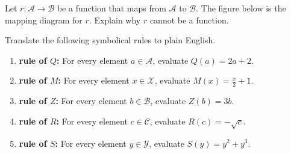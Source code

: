 \documentclass[12pt]{article} %
\begin{document}
\begin{qstn}
  Let $r \colon \mathcal{A} \to \mathcal{B}$ be a function that maps from $\mathcal{A}$ to $\mathcal{B}$. The figure below is the
  mapping diagram for $r$. Explain why $r$ cannot be a function. 

\begin{center}
\end{center}

\end{qstn}


\begin{qstn}
	Translate the following symbolical rules to plain English.
		\begin{enumerate}[label=(\alph*)]
			\item \textbf{rule of $Q$:} For every element $a\in \mathcal{A}$, evaluate $Q(a) = 2a + 2$.
			\item \textbf{rule of $M$:} For every element $x\in \mathcal{X}$, evaluate $M(x) = \frac{x}{2} + 1$.
			\item \textbf{rule of $Z$:} For every element $b\in \mathcal{B}$, evaluate  $Z(b) = 3b$.
			\item \textbf{rule of $R$:} For every element $c\in \mathcal{C}$, evaluate $R(c) = -\sqrt{c} $.
			\item \textbf{rule of $S$:} For every element $y\in \mathcal{Y}$, evaluate $S(y) = y^2 + y^3$.
		\end{enumerate}
\end{qstn}
\end{document}
